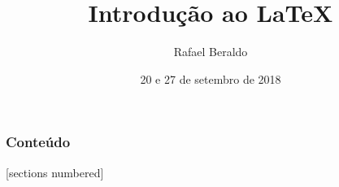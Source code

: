 \documentclass[final,notheorems]{beamer}
\title{Introdução ao \LaTeX}
\author{Rafael Beraldo \qquad \email{rberaldo@cabaladada.org}}
\date{20 e 27 de setembro de 2018}
\begin{document}
\maketitle

\begin{frame}
  \frametitle{Conteúdo}
  [sections numbered]
  \begin{multicols}{2}
    \tableofcontents
  \end{multicols}
\end{frame}

%
%
%
%
%
%
%
%
%
%
%
%
%
%
%
%
%
%


\end{document}
